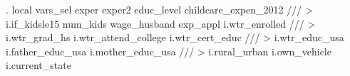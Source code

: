 . local vars_sel exper exper2 educ_level  childcare_expen_2012            ///
>         i.if_kidsle15 num_kids wage_husband exp_appl i.wtr_enrolled     ///
>         i.wtr_grad_hs i.wtr_attend_college i.wtr_cert_educ              ///
>         i.wtr_educ_usa  i.father_educ_usa i.mother_educ_usa             /// 
>         i.rural_urban i.own_vehicle i.current_state
{\smallskip}
